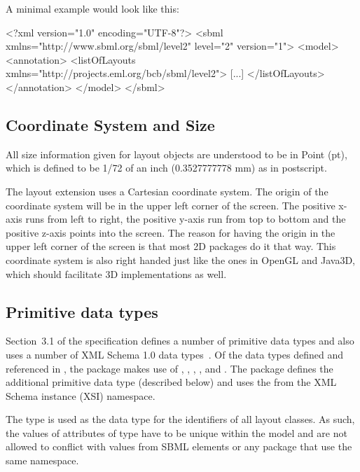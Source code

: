 \begin{center}
\end{center}

A minimal example would look like this: 

\begin{example}
<?xml version="1.0" encoding="UTF-8"?>
 <sbml xmlns="http://www.sbml.org/sbml/level2" level="2" version="1">
   <model>
	  <annotation>
		  <listOfLayouts xmlns="http://projects.eml.org/bcb/sbml/level2">
			 [...]
			</listOfLayouts>
		</annotation>
	 </model>
	</sbml>
\end{example}

\subsection{Coordinate System and Size} All size information given for 
layout objects are understood to be in Point (pt), which is defined to be 1/72 of an inch (0.3527777778 
mm) as in postscript. 

The layout extension uses a Cartesian coordinate system. The origin of 
the coordinate system will be in the upper left corner of the screen. 
The positive x-axis runs from left to right, the positive y-axis run 
from top to bottom and the positive z-axis points into the screen. The 
reason for having the origin in the upper left corner of the screen is 
that most 2D packages do it that way. This coordinate system is also 
right handed just like the ones in OpenGL and Java3D, which should 
facilitate 3D implementations as well. 

\subsection{Primitive data types} \label{primtypes} 

Section~3.1 of the \sbmlthreecore specification defines a number of 
primitive data types and also uses a number of XML Schema 1.0 data 
types~\citep{biron:2000}. Of the data types defined and referenced in 
\sbmlthreecore, the \Layout package makes use of  , , 
, ,  and 
.
The \Layout package defines the additional primitive data type
 (described below) and uses the
 from the XML Schema instance (XSI) namespace. 

The  type is used as the data type for the identifiers of 
all layout classes. As such, the values of attributes of type 
have to be unique within the model and are not allowed to conflict with
 values from SBML elements or any package that use the same
 namespace.

